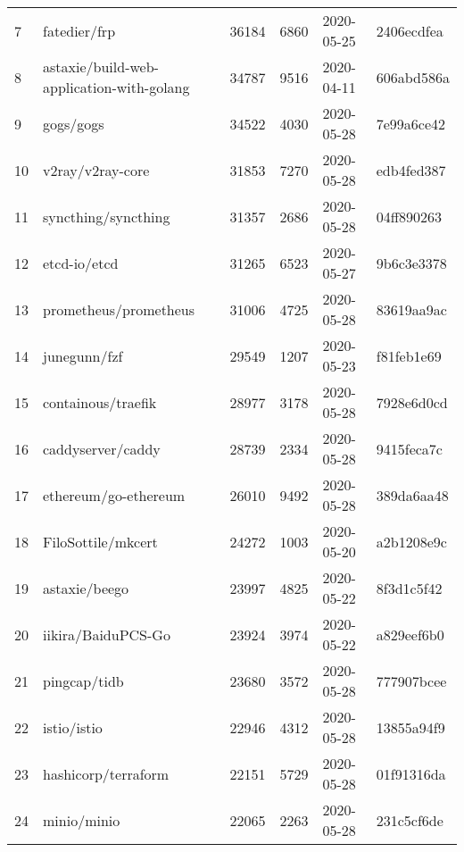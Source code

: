 \begin{longtable}{llrrll}
    7   &                                       fatedier/frp &  36184 &   6860 & 2020-05-25 &  2406ecdfea \\
    8   &          astaxie/build-web-application-with-golang &  34787 &   9516 & 2020-04-11 &  606abd586a \\
    9   &                                          gogs/gogs &  34522 &   4030 & 2020-05-28 &  7e99a6ce42 \\
    10  &                                   v2ray/v2ray-core &  31853 &   7270 & 2020-05-28 &  edb4fed387 \\
    11  &                                syncthing/syncthing &  31357 &   2686 & 2020-05-28 &  04ff890263 \\
    12  &                                       etcd-io/etcd &  31265 &   6523 & 2020-05-27 &  9b6c3e3378 \\
    13  &                              prometheus/prometheus &  31006 &   4725 & 2020-05-28 &  83619aa9ac \\
    14  &                                       junegunn/fzf &  29549 &   1207 & 2020-05-23 &  f81feb1e69 \\
    15  &                                 containous/traefik &  28977 &   3178 & 2020-05-28 &  7928e6d0cd \\
    16  &                                  caddyserver/caddy &  28739 &   2334 & 2020-05-28 &  9415feca7c \\
    17  &                               ethereum/go-ethereum &  26010 &   9492 & 2020-05-28 &  389da6aa48 \\
    18  &                                 FiloSottile/mkcert &  24272 &   1003 & 2020-05-20 &  a2b1208e9c \\
    19  &                                      astaxie/beego &  23997 &   4825 & 2020-05-22 &  8f3d1c5f42 \\
    20  &                                 iikira/BaiduPCS-Go &  23924 &   3974 & 2020-05-22 &  a829eef6b0 \\
    21  &                                       pingcap/tidb &  23680 &   3572 & 2020-05-28 &  777907bcee \\
    22  &                                        istio/istio &  22946 &   4312 & 2020-05-28 &  13855a94f9 \\
    23  &                                hashicorp/terraform &  22151 &   5729 & 2020-05-28 &  01f91316da \\
    24  &                                        minio/minio &  22065 &   2263 & 2020-05-28 &  231c5cf6de \\

\end{longtable}
